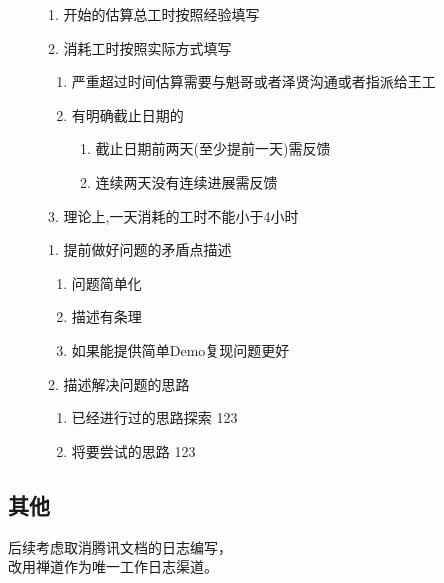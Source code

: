 \documentclass[AutoFakeBold,AutoFakeSlant]{beamer}
\begin{document}
	\begin{frame}[fragile]
		\begin{figure}
			\large
			\begin{flushleft}
				1. 开始的估算总工时按照经验填写
			\end{flushleft}
			
			\vspace{1cm}
			
			\begin{minipage}[l]{\linewidth}
				2. 消耗工时按照实际方式填写
				\footnotesize
				\begin{enumerate}
					\item 严重超过时间估算需要与魁哥或者泽贤沟通或者指派给王工
					\item 有明确截止日期的
					\begin{enumerate}
						\item 截止日期前两天(至少提前一天)需反馈
						\item 连续两天没有连续进展需反馈
					\end{enumerate}	
				\end{enumerate}
			\end{minipage}
			
			\vspace{0.5cm}
			
			\begin{flushleft}
				3. 理论上,一天消耗的工时不能小于4小时
			\end{flushleft}
		\end{figure}
	\end{frame}
	
	
	\begin{frame}[fragile]
		\begin{figure}
			\large
			\begin{minipage}[l]{\linewidth}
				1. 提前做好问题的矛盾点描述
				\footnotesize
				\begin{enumerate}
					\item 问题简单化
					\item 描述有条理
					\item 如果能提供简单Demo复现问题更好
				\end{enumerate}
			\end{minipage}
			
			\vspace{0.5cm}
			
			\begin{minipage}[l]{\linewidth}
				2. 描述解决问题的思路
				\footnotesize
				\begin{enumerate}
					\item 已经进行过的思路探索 123
					\item 将要尝试的思路 123
				\end{enumerate}
			\end{minipage}
		\end{figure}
	\end{frame}
	
	\subsection{其他}
	\begin{frame}[fragile]
		\begin{center}
			后续考虑取消腾讯文档的日志编写，\\改用禅道作为唯一工作日志渠道。
		\end{center} 
	\end{frame}
\end{document}

